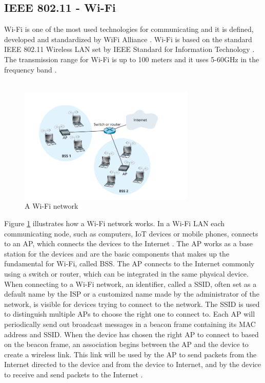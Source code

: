 \subsection{IEEE 802.11 - \gls{Wi-Fi}}
\gls{Wi-Fi} \cite{WiFiAlliance} is one of the most used technologies for communicating and it is defined, developed and standardized by WiFi Alliance \cite{WiFiAlliance}. \gls{Wi-Fi} is based on the standard IEEE 802.11 Wireless LAN set by IEEE Standard for Information Technology \cite{WifiStandard}. The transmission range for \gls{Wi-Fi} is up to 100 meters and it uses 5-60GHz in the frequency band \cite{IAQMonitorCommunicationReview}.
\\\\
\begin{figure} [H]
    \centering
    \includegraphics[width=0.75\textwidth]{figures/WiFiStandard.png}
    \caption{A \gls{Wi-Fi} network \cite{Datacom}}
    \label{fig:WiFiStandard}
\end{figure}
Figure \ref{fig:WiFiStandard} illustrates how a \gls{Wi-Fi} network works. In a \gls{Wi-Fi} \gls{LAN} each communicating node, such as computers, \gls{IoT} devices or mobile phones, connects to an \gls{AP}, which connects the devices to the Internet \cite{Datacom}. The \gls{AP} works as a base station for the devices and are the basic components that makes up the fundamental for \gls{Wi-Fi}, called \gls{BSS}. The \gls{AP} connects to the Internet commonly using a switch or router, which can be integrated in the same physical device. When connecting to a \gls{Wi-Fi} network, an identifier, called a \gls{SSID}, often set as a default name by the \gls{ISP} or a customized name made by the administrator of the network, is visible for devices trying to connect to the network. The \gls{SSID} is used to distinguish multiple \gls{AP}s to choose the right one to connect to. Each \gls{AP} will periodically send out broadcast messages in a beacon frame containing its \gls{MAC} address and \gls{SSID}. When the device has chosen the right \gls{AP} to connect to based on the beacon frame, an association begins between the \gls{AP} and the device to create a wireless link. This link will be used by the \gls{AP} to send packets from the Internet directed to the device and from the device to Internet, and by the device to receive and send packets to the Internet \cite{Datacom}. 

